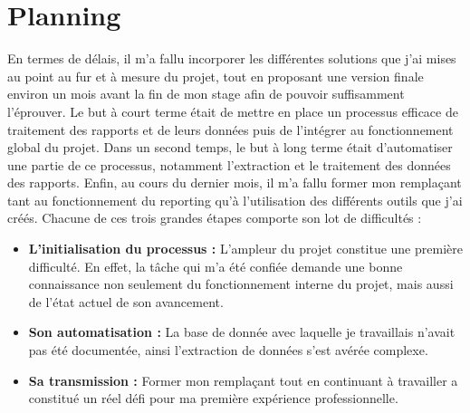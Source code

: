 \section{Planning}
En termes de délais, il m'a fallu incorporer les différentes solutions que j'ai mises au point au fur et à mesure du projet, tout en proposant une version finale environ un mois avant la fin de mon stage afin de pouvoir suffisamment l'éprouver.
Le but à court terme était de mettre en place un processus efficace de traitement des rapports et de leurs données puis de l'intégrer au fonctionnement global du projet.
Dans un second temps, le but à long terme était d'automatiser une partie de ce processus, notamment l'extraction et le traitement des données des rapports.
Enfin, au cours du dernier mois, il m'a fallu former mon remplaçant tant au fonctionnement du \gls{reporting} qu'à l'utilisation des différents outils que j'ai créés.
Chacune de ces trois grandes étapes comporte son lot de difficultés :
\begin{itemize}
\item \textbf{L'initialisation du processus :} L'ampleur du projet constitue une première difficulté. En effet, la tâche qui m'a été confiée demande une bonne connaissance non seulement du fonctionnement interne du projet, mais aussi de l'état actuel de son avancement.
\item \textbf{Son automatisation :} La base de donnée avec laquelle je travaillais n'avait pas été documentée, ainsi l'extraction de données s'est avérée complexe.
\item \textbf{Sa transmission :} Former mon remplaçant tout en continuant à travailler a constitué un réel défi pour ma première expérience professionnelle.
\end{itemize}
